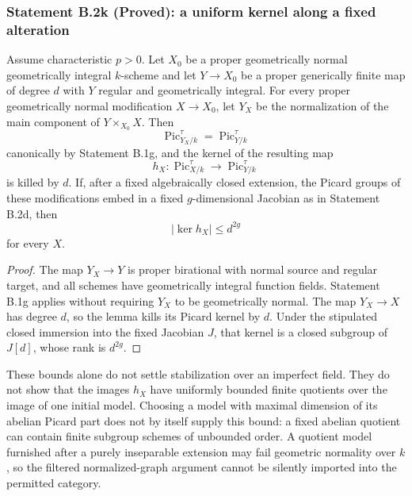 \subsubsection*{Statement B.2k (Proved): a uniform kernel along a fixed alteration}
\begin{corollary}
\label{B:B2-fixed-alteration-kernel}
Assume characteristic $p>0$.  Let $X_0$ be a proper geometrically
normal geometrically integral $k$-scheme and let $Y\to X_0$ be a
proper generically finite map of degree $d$ with $Y$ regular and
geometrically integral.  For every proper geometrically normal
modification $X\to X_0$, let $Y_X$ be the normalization of the
main component of $Y\times_{X_0}X$.  Then
\[
 \operatorname{Pic}^{\tau}_{Y_X/k}
       =\operatorname{Pic}^{\tau}_{Y/k}
\]
canonically by Statement B.1g, and the kernel of the resulting map
\[
 h_X:\operatorname{Pic}^{\tau}_{X/k}\longrightarrow
             \operatorname{Pic}^{\tau}_{Y/k}
\]
is killed by $d$.  If, after a fixed algebraically closed extension,
the Picard groups of these modifications embed in a fixed
$g$-dimensional Jacobian as in Statement B.2d, then
\[
             |\ker h_X|\leq d^{2g}
\]
for every $X$.
\end{corollary}
\begin{proof}
The map $Y_X\to Y$ is proper birational with normal source and
regular target, and all schemes have geometrically integral
function fields.  Statement B.1g applies without requiring $Y_X$
to be geometrically normal.  The map $Y_X\to X$ has degree $d$,
so the lemma kills its Picard kernel by $d$.  Under the stipulated
closed immersion into the fixed Jacobian $J$, that kernel is a
closed subgroup of $J[d]$, whose rank is $d^{2g}$.
\end{proof}

\begin{remark}
These bounds alone do not settle stabilization over an imperfect
field.  They do not show that the images $h_X$ have uniformly
bounded finite quotients over the image of one initial model.
Choosing a model with maximal dimension of its abelian Picard part
does not by itself supply this bound: a fixed abelian quotient can
contain finite subgroup schemes of unbounded order.  A quotient
model furnished after a purely inseparable extension may fail
geometric normality over $k$, so the filtered normalized-graph
argument cannot be silently imported into the permitted category.
\end{remark}
